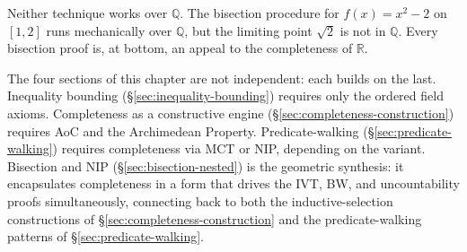 \begin{remark}
Neither technique works over $\mathbb{Q}$. The bisection procedure for
$f(x)=x^2-2$ on $[1,2]$ runs mechanically over $\mathbb{Q}$, but the
limiting point $\sqrt{2}$ is not in $\mathbb{Q}$. Every bisection proof
is, at bottom, an appeal to the completeness of $\mathbb{R}$.
\end{remark}

\begin{remark}
The four sections of this chapter are not independent: each builds on the
last. Inequality bounding (\S\ref{sec:inequality-bounding}) requires only
the ordered field axioms. Completeness as a constructive engine
(\S\ref{sec:completeness-construction}) requires AoC and the Archimedean
Property. Predicate-walking (\S\ref{sec:predicate-walking}) requires
completeness via MCT or NIP, depending on the variant. Bisection and NIP
(\S\ref{sec:bisection-nested}) is the geometric synthesis: it encapsulates
completeness in a form that drives the IVT, BW, and uncountability proofs
simultaneously, connecting back to both the inductive-selection constructions
of \S\ref{sec:completeness-construction} and the predicate-walking patterns
of \S\ref{sec:predicate-walking}.
\end{remark}

